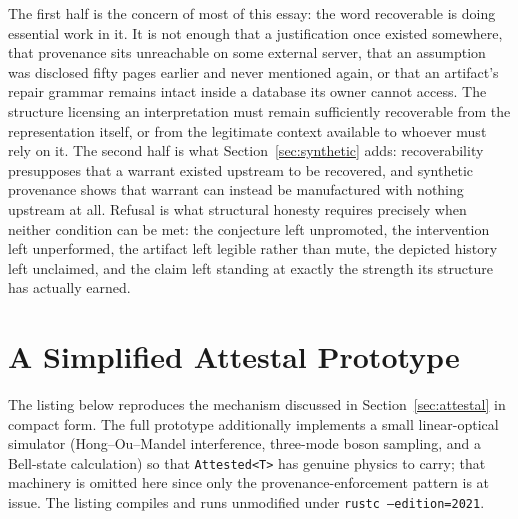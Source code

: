 \documentclass[11pt]{article}
\begin{document}
The first half is the concern of most of this essay: the word recoverable is doing essential work in it. It is not enough that a justification once existed somewhere, that provenance sits unreachable on some external server, that an assumption was disclosed fifty pages earlier and never mentioned again, or that an artifact's repair grammar remains intact inside a database its owner cannot access. The structure licensing an interpretation must remain sufficiently recoverable from the representation itself, or from the legitimate context available to whoever must rely on it. The second half is what Section~\ref{sec:synthetic} adds: recoverability presupposes that a warrant existed upstream to be recovered, and synthetic provenance shows that warrant can instead be manufactured with nothing upstream at all. Refusal is what structural honesty requires precisely when neither condition can be met: the conjecture left unpromoted, the intervention left unperformed, the artifact left legible rather than mute, the depicted history left unclaimed, and the claim left standing at exactly the strength its structure has actually earned.

\appendix

\section{A Simplified Attestal Prototype}
\label{app:attestal}

The listing below reproduces the mechanism discussed in Section~\ref{sec:attestal} in compact form. The full prototype additionally implements a small linear-optical simulator (Hong--Ou--Mandel interference, three-mode boson sampling, and a Bell-state calculation) so that \texttt{Attested<T>} has genuine physics to carry; that machinery is omitted here since only the provenance-enforcement pattern is at issue. The listing compiles and runs unmodified under \texttt{rustc --edition=2021}.
\end{document}
